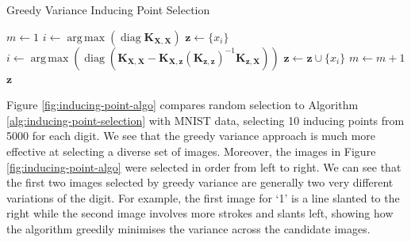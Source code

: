 \documentclass{article}
\newcommand{\diag}{\operatorname{diag}}
\DeclareMathOperator*{\argmax}{arg\,max}
\numberwithin{equation}{section}
\begin{document}
\begin{algorithm}
\caption{Greedy Variance Inducing Point Selection}\label{alg:inducing-point-selection}
\begin{algorithmic}
\State $m \leftarrow 1$
 \State $i \leftarrow \argmax \left(\diag\mathbf{K}_{\mathbf{X}, \mathbf{X}}\right) $
 \State $\mathbf{z} \leftarrow \{x_i\}$ 
\State$i \leftarrow \argmax \left(\diag \left(\mathbf{K}_{\mathbf{X}, \mathbf{X}} - \mathbf{K}_{\mathbf{X}, \mathbf{z}} \left(\mathbf{K}_{\mathbf{z}, \mathbf{z}}\right)^{-1}\mathbf{K}_{\mathbf{z}, \mathbf{X}}\right)\right)$
 \State  $\mathbf{z} \leftarrow \mathbf{z} \cup \{x_i\}$ 
 \State  $m \leftarrow m+1$
\EndWhile
\State \Return $\mathbf{z}$
\end{algorithmic}
\end{algorithm}

Figure \ref{fig:inducing-point-algo} compares random selection to Algorithm \ref{alg:inducing-point-selection} with MNIST data, selecting 10 inducing points from 5000 for each digit. 
We see that the greedy variance approach is much more effective at selecting a diverse set of images.
Moreover, the images in Figure \ref{fig:inducing-point-algo} were selected in order from left to right.
We can see that the first two images selected by greedy variance are generally two very different variations of the digit.
For example, the first image for `1' is a line slanted to the right while the second image involves more strokes and slants left, showing how the algorithm greedily minimises the variance across the candidate images.
\end{document}
